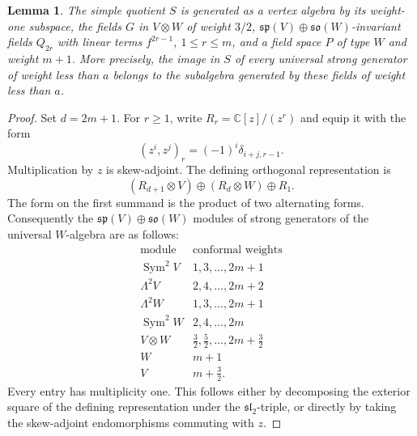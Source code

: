 \documentclass[11pt,a4paper]{amsart}
\numberwithin{equation}{section}
\newtheorem{lemma}[theorem]{Lemma}
\theoremstyle{definition}
\theoremstyle{remark}
\begin{document}
\begin{lemma}\label{seed:D-centralizer-generators}
The simple quotient $S$ is generated as a vertex algebra
by its weight-one subspace, the fields $G$ in $V\otimes W$ of weight $3/2$,
$\mathfrak{sp}(V)\oplus\mathfrak{so}(W)$-invariant fields $Q_{2r}$ with linear terms $f^{2r-1}$, $1\leq r\leq m$,
and a field space $P$ of type $W$ and weight $m+1$. More precisely,
the image in $S$ of every universal strong generator of weight less than $a$ belongs to
the subalgebra generated by these fields of weight less than $a$.
\end{lemma}
\begin{proof}
Set $d=2m+1$. For $r\geq1$, write
$R_r=\mathbb C[z]/(z^r)$ and equip it with the form
$$
 (z^i,z^j)_r=(-1)^i\delta_{i+j,r-1}.
$$
Multiplication by $z$ is skew-adjoint. The defining orthogonal
representation is
$$
 (R_{d+1}\otimes V)\oplus(R_d\otimes W)\oplus R_1.
$$
The form on the first summand is the product of two alternating forms.
Consequently the $\mathfrak{sp}(V)\oplus\mathfrak{so}(W)$ modules of
strong generators of the universal $W$-algebra are as follows:
$$
\begin{array}{c|c}
\text{module}&\text{conformal weights}\\\hline
\operatorname{Sym}^2V&1,3,\ldots,2m+1\\
\Lambda^2V&2,4,\ldots,2m+2\\
\Lambda^2W&1,3,\ldots,2m+1\\
\operatorname{Sym}^2W&2,4,\ldots,2m\\
V\otimes W&\frac32,\frac52,\ldots,2m+\frac32\\
W&m+1\\
V&m+\frac32.
\end{array}
$$
Every entry has multiplicity one. This follows either by decomposing
the exterior square of the defining representation under the
$\mathfrak{sl}_2$-triple, or directly by taking the skew-adjoint
endomorphisms commuting with $z$.


\end{proof}
\end{document}

